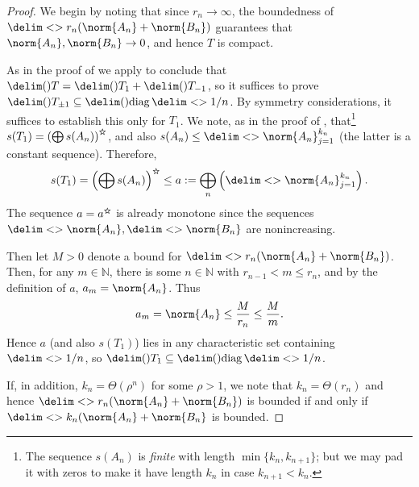 \documentclass[10pt,reqno]{amsart}
\theoremstyle{remark}
\newcommand\openbigstar[1][0.65]{%
  \scalerel*{%
    \stackinset{c}{0pt}{c}{}{\scalebox{#1}{\color{white}{$\bigstar$}}}{%
      $\bigstar$}%
  }{\bigstar}
}
\DeclareMathOperator{\diag}{diag}
\newcommand{\seq}{\delim<>}
\newcommand{\ideal}{\delim()}
\renewcommand{\star}{\openbigstar}
\numberwithin{equation}{section}
\begin{document}
\begin{proof}
  We begin by noting that since $r_n \to \infty$, the boundedness of $\seq{r_n (\norm{A_n} + \norm{B_n})}$ guarantees that $\norm{A_n}, \norm{B_n} \to 0$, and hence $T$ is compact.
  
  As in the proof of  we apply  to conclude that $\ideal{T} = \ideal{T_1} + \ideal{T_{-1}}$, so it suffices to prove $\ideal{T_{\pm 1}} \subseteq \ideal{\diag\seq{1/n}}$.
  By symmetry considerations, it suffices to establish this only for $T_1$.
  We note, as in the proof of , that\footnote{%
    The sequence $s(A_n)$ is \emph{finite} with length $\min\{k_n, k_{n+1}\}$; but we may pad it with zeros to make it have length $k_n$ in case $k_{n+1} < k_n$.}
  $s(T_1) = \left( \bigoplus s(A_n) \right)^{\star}$, and also $s(A_n) \le \seq{\norm{A_n}}_{j=1}^{k_n}$ (the latter is a constant sequence).
  Therefore,
  \begin{equation*}
    s(T_1) = \left( \bigoplus s(A_n) \right)^{\star} \le a := \bigoplus_n \left( \seq{\norm{A_n}}_{j=1}^{k_n} \right).
  \end{equation*}
  The sequence $a = a^{\star}$ is already monotone since the sequences $\seq{\norm{A_n}}, \seq{\norm{B_n}}$ are nonincreasing.

  Then let $M > 0$ denote a bound for $\seq{r_n (\norm{A_n} + \norm{B_n})}$.
  Then, for any $m \in \mathbb{N}$, there is some $n \in \mathbb{N}$ with $r_{n-1} < m \le r_n$, and by the definition of $a$, $a_m = \norm{A_n}$.
  Thus
  \begin{equation*}
    a_m = \norm{A_n} \le \frac{M}{r_n} \le \frac{M}{m}.
  \end{equation*}
  Hence $a$ (and also $s(T_1)$) lies in any characteristic set containing $\seq{1/n}$, so $\ideal{T_1} \subseteq \ideal{\diag \seq{1/n}}$.

  If, in addition, $k_n = \Theta(\rho^n)$ for some $\rho > 1$, we note that $k_n = \Theta(r_n)$ and hence $\seq{r_n(\norm{A_n} + \norm{B_n})}$ is bounded if and only if $\seq{k_n(\norm{A_n} + \norm{B_n}}$ is bounded.
\end{proof}




\end{document}
